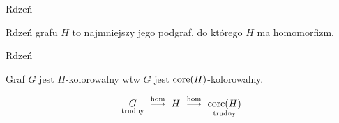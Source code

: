 \begin{frame}{Rdzeń}

Rdzeń grafu \(H\) to najmniejszy jego podgraf, do którego \(H\) ma homomorfizm.

\vspace{1em}
\begin{figure}
    \centering
    
\end{figure}

\end{frame}


\begin{frame}{Rdzeń}

Graf \(G\) jest \(H\)-kolorowalny wtw \(G\) jest \(\text{core}(H)\)-kolorowalny.

\vspace{1em}
\begin{figure}
    \centering
    
\end{figure}

\vspace{1em}

\LARGE
\[ \underset{\text{trudny}}{G} \ \overset{\text{hom}}{\longrightarrow} \ H \ \overset{\text{hom}}{\longrightarrow} \ \underset{\text{trudny}}{\core(H)} \]

\end{frame}
